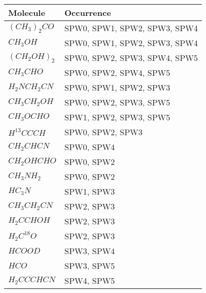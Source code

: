 \documentclass[10pt]{article}
\begin{document}
\begin{table}[htb]
\small
    \centering    
    \begin{tabular}{l l} 
\hline
Molecule & Occurrence \\
\hline
$(CH_{3})_{2}CO$ & SPW0, SPW1, SPW2, SPW3, SPW4 \\
$CH_{3}OH$ & SPW0, SPW1, SPW2, SPW3, SPW4 \\
$(CH_{2}OH)_{2}$ & SPW0, SPW2, SPW3, SPW4, SPW5 \\
$CH_{3}CHO$ & SPW0, SPW2, SPW4, SPW5 \\
$H_{2}NCH_{2}CN$ & SPW0, SPW1, SPW2, SPW3 \\
$CH_{3}CH_{2}OH$ & SPW0, SPW2, SPW3, SPW5 \\
$CH_{3}OCHO$ & SPW1, SPW2, SPW3, SPW5 \\
$H^{13}CCCH$ & SPW0, SPW2, SPW3 \\
$CH_{2}CHCN$ & SPW0, SPW4 \\
$CH_{2}OHCHO$ & SPW0, SPW2 \\
$CH_{3}NH_{2}$ & SPW0, SPW2 \\
$HC_{3}N$ & SPW1, SPW3 \\
$CH_{3}CH_{2}CN$ & SPW2, SPW3 \\
$H_{2}CCHOH$ & SPW2, SPW3 \\
$H_{2}C^{18}O$ & SPW2, SPW3 \\
$HCOOD$ & SPW3, SPW4 \\
$HCO$ & SPW3, SPW5 \\
$H_{2}CCCHCN$ & SPW4, SPW5 \\
\hline

    \end{tabular}
\end{table}
\end{document}
